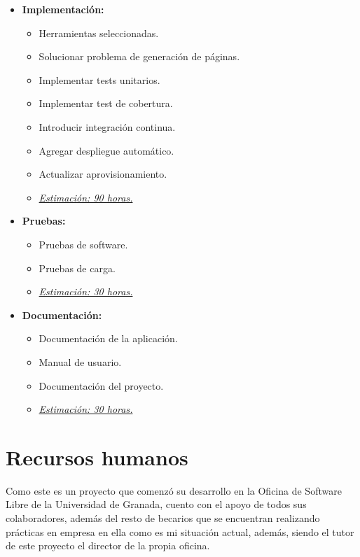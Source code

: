 \begin{itemize}
 \item \textbf{Implementación:}
 \begin{itemize}
  \item Herramientas seleccionadas.
  \item Solucionar problema de generación de páginas.
  \item Implementar tests unitarios.
  \item Implementar test de cobertura.
  \item Introducir integración continua.
  \item Agregar despliegue automático.
  \item Actualizar aprovisionamiento.
  \item \underline{\textit{Estimación: 90 horas.}}
 \end{itemize}
\end{itemize}

\newpage
\begin{itemize}
 \item \textbf{Pruebas:}
 \begin{itemize}
  \item Pruebas de software.
  \item Pruebas de carga.
  \item \underline{\textit{Estimación: 30 horas.}}
 \end{itemize}
\end{itemize}

\begin{itemize}
 \item \textbf{Documentación:}
 \begin{itemize}
  \item Documentación de la aplicación.
  \item Manual de usuario.
  \item Documentación del proyecto.
  \item \underline{\textit{Estimación: 30 horas.}}
 \end{itemize}
\end{itemize}

\section{Recursos humanos}

Como este es un proyecto que comenzó su desarrollo en la Oficina de Software Libre de la Universidad de Granada, cuento con el apoyo de todos sus colaboradores, además del resto de becarios que se encuentran realizando prácticas en empresa en ella como es mi situación actual, además, siendo el tutor de este proyecto el director de la propia oficina.

